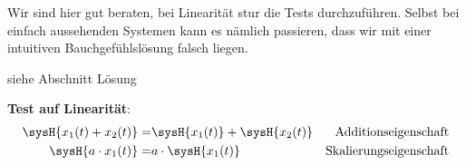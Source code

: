 \begin{Ansatz}
Wir sind hier gut beraten, bei Linearität stur die Tests durchzuführen.
Selbst bei einfach aussehenden Systemen kann es nämlich passieren, dass wir mit
einer intuitiven Bauchgefühlslösung falsch liegen.
\end{Ansatz}
\begin{ExCalc}
siehe Abschnitt Lösung
\end{ExCalc}


\begin{Loesung}
\textbf{Test auf Linearität}:
\begin{align}
\sysH{x_1(t) + x_2(t)} =& \sysH{x_1(t)} + \sysH{x_2(t)} &\text{Additionseigenschaft}\\
\sysH{a \cdot x_1(t)} =& a \cdot \sysH{x_1(t)} &\text{Skalierungseigenschaft}
\end{align}


\end{Loesung}
